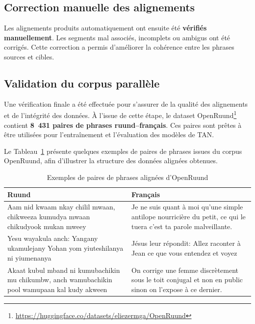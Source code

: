 \subsection{Correction manuelle des alignements}

Les alignements produits automatiquement ont ensuite été \textbf{vérifiés manuellement}. Les segments mal associés, incomplets ou ambigus ont été corrigés. Cette correction a permis d'améliorer la cohérence entre les phrases sources et cibles.

\subsection{Validation du corpus parallèle}

Une vérification finale a été effectuée pour s'assurer de la qualité des alignements et de l'intégrité des données. À l'issue de cette étape, le dataset OpenRuund\footnote{\url{https://huggingface.co/datasets/eliezermga/OpenRuund}} contient \textbf{8~431 paires de phrases ruund–français}. Ces paires sont prêtes à être utilisées pour l'entraînement et l'évaluation des modèles de \ac{TAN}.

Le Tableau~\ref{tab:extrait_corpus} présente quelques exemples de paires de phrases issues du corpus OpenRuund, afin d'illustrer la structure des données alignées obtenues.

\begin{table}[H]
\centering
\renewcommand{\arraystretch}{1.6}
\begin{tabular}{p{7.2cm}p{7.2cm}}
\toprule
\textbf{Ruund} & \textbf{Français} \\
\midrule
Aam nid kwaam nkay chilil mwaan, chikweeza kumudya mwaan chikudyook mukan mweey &
Je ne suis quant à moi qu'une simple antilope nourricière du petit, ce qui le tuera c'est ta parole malveillante. \\

Yesu wayakula anch: Yangany ukamulejany Yohan yom yiuteshilanya ni yiumenanya &
Jésus leur répondit: Allez raconter à Jean ce que vous entendez et voyez \\

Akaat kubul mband ni kumubachikin mu chikumbw, anch wamubachikin pool wamupaan kal kudy akween &
On corrige une femme discrètement sous le toit conjugal et non en public sinon on l'expose à ce dernier. \\

\bottomrule
\end{tabular}
\caption{Exemples de paires de phrases alignées d'OpenRuund}
\label{tab:extrait_corpus}
\end{table}

